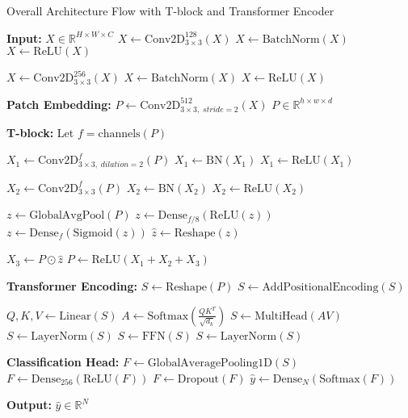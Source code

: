 \documentclass{article}
\begin{document}
\begin{algorithm}
\caption{Overall Architecture Flow with T-block and Transformer Encoder}
\begin{algorithmic}[1]

\State \textbf{Input:} $X \in \mathbb{R}^{H \times W \times C}$
\State $X \gets \text{Conv2D}_{3 \times 3}^{128}(X)$
\State $X \gets \text{BatchNorm}(X)$
\State $X \gets \text{ReLU}(X)$

\State $X \gets \text{Conv2D}_{3 \times 3}^{256}(X)$
\State $X \gets \text{BatchNorm}(X)$
\State $X \gets \text{ReLU}(X)$

\vspace{0.5em}
\State \textbf{Patch Embedding:}
\State $P \gets \text{Conv2D}_{3 \times 3,\; stride=2}^{512}(X)$
\State $P \in \mathbb{R}^{h \times w \times d}$

\vspace{0.5em}
\State \textbf{T-block:}
\State Let $f = \text{channels}(P)$

\State $X_1 \gets \text{Conv2D}_{3 \times 3,\; dilation=2}^{f}(P)$
\State $X_1 \gets \text{BN}(X_1)$
\State $X_1 \gets \text{ReLU}(X_1)$

\State $X_2 \gets \text{Conv2D}_{3 \times 3}^{f}(P)$
\State $X_2 \gets \text{BN}(X_2)$
\State $X_2 \gets \text{ReLU}(X_2)$

\State $z \gets \text{GlobalAvgPool}(P)$ 
\State $z \gets \text{Dense}_{f/8}(\text{ReLU}(z))$
\State $z \gets \text{Dense}_{f}(\text{Sigmoid}(z))$
\State $\hat{z} \gets \text{Reshape}(z)$ 

\State $X_3 \gets P \odot \hat{z}$ 
\State $P \gets \text{ReLU}(X_1 + X_2 + X_3)$

\vspace{0.5em}
\State \textbf{Transformer Encoding:}
\State $S \gets \text{Reshape}(P)$ 
\State $S \gets \text{AddPositionalEncoding}(S)$

    \State $Q,K,V \gets \text{Linear}(S)$
    \State $A \gets \text{Softmax}\left( \frac{QK^T}{\sqrt{d_k}} \right)$
    \State $S \gets \text{MultiHead}(A V)$
    \State $S \gets \text{LayerNorm}(S)$
    \State $S \gets \text{FFN}(S)$
    \State $S \gets \text{LayerNorm}(S)$
\EndFor

\vspace{0.5em}
\State \textbf{Classification Head:}
\State $F \gets \text{GlobalAveragePooling1D}(S)$
\State $F \gets \text{Dense}_{256}(\text{ReLU}(F))$
\State $F \gets \text{Dropout}(F)$
\State $\hat{y} \gets \text{Dense}_{N}(\text{Softmax}(F))$

\State \textbf{Output:} $\hat{y} \in \mathbb{R}^{N}$

\end{algorithmic}
\end{algorithm}
\end{document}
